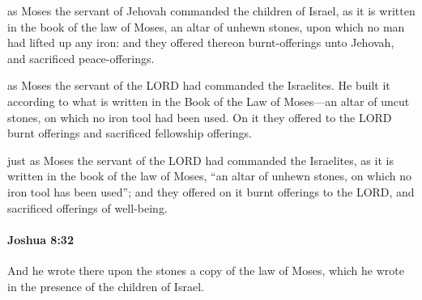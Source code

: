 			\begin{versebox}
					\item[BHS] 
					\item[ASV] as Moses the servant of Jehovah commanded the children of Israel, as it is written in the book of the law of Moses, an altar of unhewn stones, upon which no man had lifted up any iron: and they offered thereon burnt-offerings unto Jehovah, and sacrificed peace-offerings.
					\item[NIV] as Moses the servant of the LORD had commanded the Israelites. He built it according to what is written in the Book of the Law of Moses—an altar of uncut stones, on which no iron tool had been used. On it they offered to the LORD burnt offerings and sacrificed fellowship offerings.
					\item[NRSV] just as Moses the servant of the LORD had commanded the Israelites, as it is written in the book of the law of Moses, “an altar of unhewn stones, on which no iron tool has been used”; and they offered on it burnt offerings to the LORD, and sacrificed offerings of well-being.
			\end{versebox}

		\paragraph{Joshua 8:32} %
			\label{JOSHUA-8-32}

			And he wrote there upon the stones a copy of the law of Moses, which he wrote in the presence of the children of Israel.

